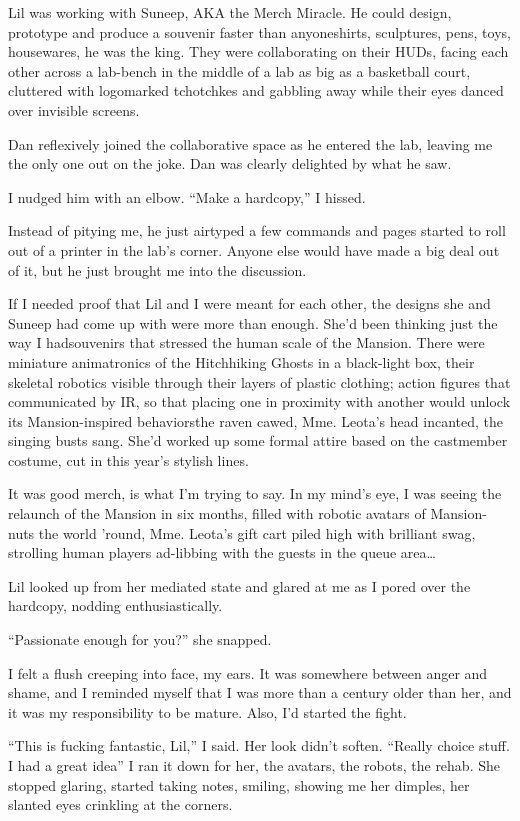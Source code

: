 Lil was working with Suneep, AKA the Merch Miracle. He could
design, prototype and produce a souvenir faster than anyone{\dash}shirts,
sculptures, pens, toys, housewares, he was the king. They were
collaborating on their HUDs, facing each other across a lab-bench
in the middle of a lab as big as a basketball court, cluttered with
logomarked tchotchkes and gabbling away while their eyes danced
over invisible screens.

Dan reflexively joined the collaborative space as he entered the
lab, leaving me the only one out on the joke. Dan was clearly
delighted by what he saw.

I nudged him with an elbow. “Make a hardcopy,” I hissed.

Instead of pitying me, he just airtyped a few commands and pages
started to roll out of a printer in the lab's corner. Anyone else
would have made a big deal out of it, but he just brought me into
the discussion.

If I needed proof that Lil and I were meant for each other, the
designs she and Suneep had come up with were more than enough.
She'd been thinking just the way I had{\dash}souvenirs that stressed the
human scale of the Mansion. There were miniature animatronics of
the Hitchhiking Ghosts in a black-light box, their skeletal
robotics visible through their layers of plastic clothing; action
figures that communicated by IR, so that placing one in proximity
with another would unlock its Mansion-inspired behaviors{\dash}the raven
cawed, Mme. Leota's head incanted, the singing busts sang. She'd
worked up some formal attire based on the castmember costume, cut
in this year's stylish lines.

It was good merch, is what I'm trying to say. In my mind's eye, I
was seeing the relaunch of the Mansion in six months, filled with
robotic avatars of Mansion-nuts the world 'round, Mme. Leota's gift
cart piled high with brilliant swag, strolling human players
ad-libbing with the guests in the queue area…

Lil looked up from her mediated state and glared at me as I pored
over the hardcopy, nodding enthusiastically.

“Passionate enough for you?” she snapped.

I felt a flush creeping into face, my ears. It was somewhere
between anger and shame, and I reminded myself that I was more than
a century older than her, and it was my responsibility to be
mature. Also, I'd started the fight.

“This is fucking fantastic, Lil,” I said. Her look didn't soften.
“Really choice stuff. I had a great idea{\dash}” I ran it down for her,
the avatars, the robots, the rehab. She stopped glaring, started
taking notes, smiling, showing me her dimples, her slanted eyes
crinkling at the corners.

